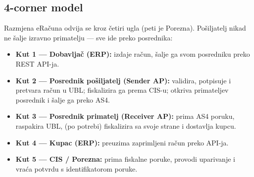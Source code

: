 \documentclass[11pt,a4paper]{article}
\begin{document}
\subsection{4-corner model}

Razmjena eRačuna odvija se kroz četiri ugla (peti je Porezna). Pošiljatelj nikad ne
šalje izravno primatelju — sve ide preko posrednika:

\begin{center}
\end{center}

\begin{itemize}[nosep]
  \item \textbf{Kut 1 — Dobavljač (ERP):} izdaje račun, šalje ga svom posredniku preko REST API-ja.
  \item \textbf{Kut 2 — Posrednik pošiljatelj (Sender AP):} validira, potpisuje i pretvara račun u
        UBL; fiskalizira ga prema CIS-u; otkriva primateljev posrednik i šalje ga preko AS4.
  \item \textbf{Kut 3 — Posrednik primatelj (Receiver AP):} prima AS4 poruku, raspakira UBL,
        (po potrebi) fiskalizira sa svoje strane i dostavlja kupcu.
  \item \textbf{Kut 4 — Kupac (ERP):} preuzima zaprimljeni račun preko API-ja.
  \item \textbf{Kut 5 — CIS / Porezna:} prima fiskalne poruke, provodi uparivanje i vraća potvrdu s identifikatorom poruke.
\end{itemize}
\end{document}
